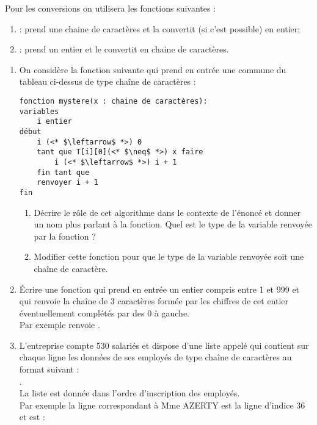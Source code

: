 \documentclass[a4paper,11pt,french]{book}
\begin{document}
Pour les conversions on utilisera les fonctions suivantes :
\begin{enumerate}[--]
	\item 	{} : prend une chaine de caractères et la convertit (si c'est possible) en entier;
	\item 	{} : prend un entier et le convertit en chaine de caractères.
\end{enumerate}

\begin{enumerate}[\bfseries 1.]
	\item 	On considère la fonction  suivante qui prend en entrée une commune du tableau ci-dessus de type chaîne de caractères :
\begin{pseudocode}\begin{lstlisting}[language=naturel]
fonction mystere(x : chaine de caractères):
variables
	i entier
début
	i (<* $\leftarrow$ *>) 0
	tant que T[i][0](<* $\neq$ *>) x faire
		i (<* $\leftarrow$ *>) i + 1
	fin tant que
	renvoyer i + 1
fin
\end{lstlisting}\end{pseudocode}
\begin{enumerate}[\bfseries a.]
	\item 	Décrire le rôle de cet algorithme dans le contexte de l'énoncé et donner un nom plus parlant à la fonction.
			Quel est le type de la variable renvoyée par la fonction ?
	\item 	Modifier cette fonction pour que le type de la variable renvoyée soit une chaîne de caractère.	
\end{enumerate}
	\item \'Ecrire une fonction  qui prend en entrée un entier compris entre 1 et 999 et qui renvoie la chaîne de 3 caractères formée par les chiffres de cet entier éventuellement complétés par des 0 à gauche.\\
	Par exemple  renvoie .
	\item    L’entreprise compte 530 salariés et dispose d’une liste appelé  qui contient sur chaque ligne les données de ses employés de type chaîne de caractères au format suivant :\\
	.\\
	La liste est donnée dans l'ordre d'inscription des employés.\\
	Par exemple la ligne correspondant à Mme AZERTY est la ligne d'indice 36 et est :\\

\end{enumerate}
\end{document}
